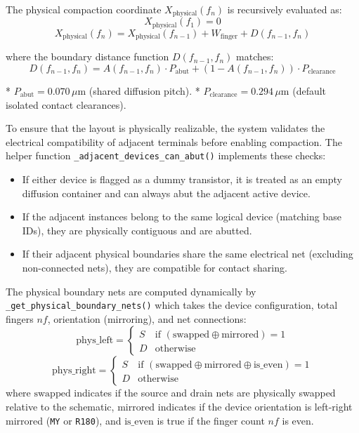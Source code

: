 The physical compaction coordinate $X_{\text{physical}}(f_n)$ is recursively evaluated as:
\[X_{\text{physical}}(f_1) = 0\]
\[X_{\text{physical}}(f_n) = X_{\text{physical}}(f_{n-1}) + W_{\text{finger}} + D(f_{n-1}, f_n)\]

where the boundary distance function $D(f_{n-1}, f_n)$ matches:
\[D(f_{n-1}, f_n) = A(f_{n-1}, f_n) \cdot P_{\text{abut}} + (1 - A(f_{n-1}, f_n)) \cdot P_{\text{clearance}}\]

*   $P_{\text{abut}} = 0.070\,\mu\text{m}$ (shared diffusion pitch).
*   $P_{\text{clearance}} = 0.294\,\mu\text{m}$ (default isolated contact clearances).

To ensure that the layout is physically realizable, the system validates the electrical compatibility of adjacent terminals before enabling compaction. The helper function \texttt{\_adjacent\_}\allowbreak\texttt{devices\_}\allowbreak\texttt{can\_}\allowbreak\texttt{abut()} implements these checks:
\begin{itemize}
    \item If either device is flagged as a dummy transistor, it is treated as an empty diffusion container and can always abut the adjacent active device.
    \item If the adjacent instances belong to the same logical device (matching base IDs), they are physically contiguous and are abutted.
    \item If their adjacent physical boundaries share the same electrical net (excluding non-connected nets), they are compatible for contact sharing.
\end{itemize}

The physical boundary nets are computed dynamically by \texttt{\_get\_}\allowbreak\texttt{physical\_}\allowbreak\texttt{boundary\_}\allowbreak\texttt{nets()} which takes the device configuration, total fingers $nf$, orientation (mirroring), and net connections:
\begin{equation}
    \text{phys\_left} = \begin{cases}
        S & \text{if } (\text{swapped} \oplus \text{mirrored}) = 1 \\
        D & \text{otherwise}
    \end{cases}
\end{equation}
\begin{equation}
    \text{phys\_right} = \begin{cases}
        S & \text{if } (\text{swapped} \oplus \text{mirrored} \oplus \text{is\_even}) = 1 \\
        D & \text{otherwise}
    \end{cases}
\end{equation}
where $\text{swapped}$ indicates if the source and drain nets are physically swapped relative to the schematic, $\text{mirrored}$ indicates if the device orientation is left-right mirrored (\texttt{MY} or \texttt{R180}), and $\text{is\_even}$ is true if the finger count $nf$ is even.

